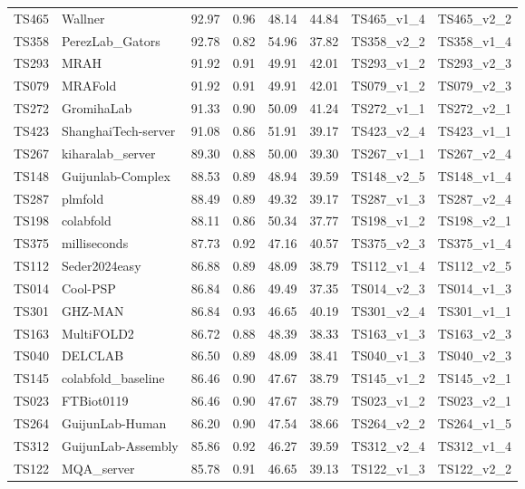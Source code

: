 \begin{longtable}{llllllll}
TS465 & Wallner & 92.97 & 0.96 & 48.14 & 44.84 & TS465\_v1\_4 & TS465\_v2\_2 \\ 
TS358 & PerezLab\_Gators & 92.78 & 0.82 & 54.96 & 37.82 & TS358\_v2\_2 & TS358\_v1\_4 \\ 
TS293 & MRAH & 91.92 & 0.91 & 49.91 & 42.01 & TS293\_v1\_2 & TS293\_v2\_3 \\ 
TS079 & MRAFold & 91.92 & 0.91 & 49.91 & 42.01 & TS079\_v1\_2 & TS079\_v2\_3 \\ 
TS272 & GromihaLab & 91.33 & 0.90 & 50.09 & 41.24 & TS272\_v1\_1 & TS272\_v2\_1 \\ 
TS423 & ShanghaiTech-server & 91.08 & 0.86 & 51.91 & 39.17 & TS423\_v2\_4 & TS423\_v1\_1 \\ 
TS267 & kiharalab\_server & 89.30 & 0.88 & 50.00 & 39.30 & TS267\_v1\_1 & TS267\_v2\_4 \\ 
TS148 & Guijunlab-Complex & 88.53 & 0.89 & 48.94 & 39.59 & TS148\_v2\_5 & TS148\_v1\_4 \\ 
TS287 & plmfold & 88.49 & 0.89 & 49.32 & 39.17 & TS287\_v1\_3 & TS287\_v2\_4 \\ 
TS198 & colabfold & 88.11 & 0.86 & 50.34 & 37.77 & TS198\_v1\_2 & TS198\_v2\_1 \\ 
TS375 & milliseconds & 87.73 & 0.92 & 47.16 & 40.57 & TS375\_v2\_3 & TS375\_v1\_4 \\ 
TS112 & Seder2024easy & 86.88 & 0.89 & 48.09 & 38.79 & TS112\_v1\_4 & TS112\_v2\_5 \\ 
TS014 & Cool-PSP & 86.84 & 0.86 & 49.49 & 37.35 & TS014\_v2\_3 & TS014\_v1\_3 \\ 
TS301 & GHZ-MAN & 86.84 & 0.93 & 46.65 & 40.19 & TS301\_v2\_4 & TS301\_v1\_1 \\ 
TS163 & MultiFOLD2 & 86.72 & 0.88 & 48.39 & 38.33 & TS163\_v1\_3 & TS163\_v2\_3 \\ 
TS040 & DELCLAB & 86.50 & 0.89 & 48.09 & 38.41 & TS040\_v1\_3 & TS040\_v2\_3 \\ 
TS145 & colabfold\_baseline & 86.46 & 0.90 & 47.67 & 38.79 & TS145\_v1\_2 & TS145\_v2\_1 \\ 
TS023 & FTBiot0119 & 86.46 & 0.90 & 47.67 & 38.79 & TS023\_v1\_2 & TS023\_v2\_1 \\ 
TS264 & GuijunLab-Human & 86.20 & 0.90 & 47.54 & 38.66 & TS264\_v2\_2 & TS264\_v1\_5 \\ 
TS312 & GuijunLab-Assembly & 85.86 & 0.92 & 46.27 & 39.59 & TS312\_v2\_4 & TS312\_v1\_4 \\ 
TS122 & MQA\_server & 85.78 & 0.91 & 46.65 & 39.13 & TS122\_v1\_3 & TS122\_v2\_2 \\ 

\end{longtable}
